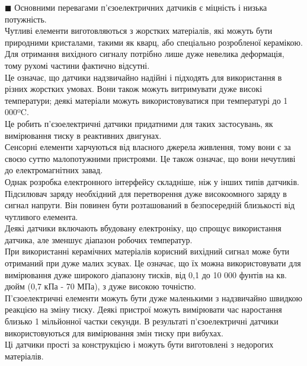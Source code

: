 \documentclass[a4paper,fontsize=12]{report}
\begin{document}
\clearpage
$\blacksquare$ Основними перевагами п'єзоелектричних датчиків є міцність і низька потужність.\\

  Чутливі елементи виготовляються з жорстких матеріалів, які можуть бути природними кристалами, такими як кварц, або спеціально розробленої керамікою. Для отримання вихідного сигналу потрібно лише дуже невелика деформація, тому рухомі частини фактично відсутні.\\

  Це означає, що датчики надзвичайно надійні і підходять для використання в різних жорстких умовах. Вони також можуть витримувати дуже високі температури; деякі матеріали можуть використовуватися при температурі до 1 000ºC.\\

  Це робить п'єзоелектричні датчики придатними для таких застосувань, як вимірювання тиску в реактивних двигунах.\\

  Сенсорні елементи харчуються від власного джерела живлення, тому вони є за своєю суттю малопотужними пристроями. Це також означає, що вони нечутливі до електромагнітних завад.\\

  Однак розробка електронного інтерфейсу складніше, ніж у інших типів датчиків. Підсилювач заряду необхідний для перетворення дуже високоомного заряду в сигнал напруги. Він повинен бути розташований в безпосередній близькості від чутливого елемента.\\

  Деякі датчики включають вбудовану електроніку, що спрощує використання датчика, але зменшує діапазон робочих температур.\\

  При використанні керамічних матеріалів корисний вихідний сигнал може бути отриманий при дуже малих зсувах. Це означає, що їх можна використовувати для вимірювання дуже широкого діапазону тисків, від 0,1 до 10 000 фунтів на кв. дюйм (0,7 кПа - 70 МПа), з дуже високою точністю.\\

  П'єзоелектричні елементи можуть бути дуже маленькими з надзвичайно швидкою реакцією на зміну тиску. Деякі пристрої можуть вимірювати час наростання близько 1 мільйонної частки секунди. В результаті п'єзоелектричні датчики використовуються для вимірювання змін тиску при вибухах.\\

  Ці датчики прості за конструкцією і можуть бути виготовлені з недорогих матеріалів.\\
\end{document}
